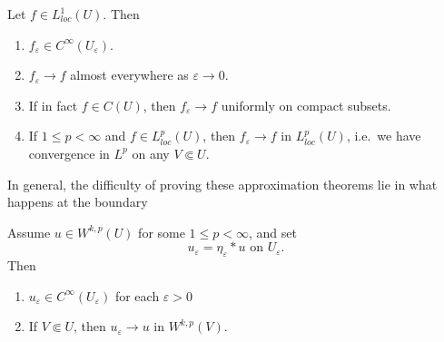 \documentclass[a4paper]{article}
\begin{document}
\begin{thm}
  Let $f \in L^1_{loc}(U)$. Then
  \begin{enumerate}
    \item $f_\varepsilon \in C^\infty(U_\varepsilon)$.
    \item $f_\varepsilon \to f$ almost everywhere as $\varepsilon \to 0$.
    \item If in fact $f \in C(U)$, then $f_\varepsilon \to f$ uniformly on compact subsets.
    \item If $1 \leq p < \infty$ and $f \in L^p_{loc}(U)$, then $f_\varepsilon \to f$ in $L^p_{loc}(U)$, i.e.\ we have convergence in $L^p$ on any $V \Subset U$.\fakeqed
  \end{enumerate}
\end{thm}
In general, the difficulty of proving these approximation theorems lie in what happens at the boundary
\begin{lemma}
  Assume $u \in W^{k, p}(U)$ for some $1 \leq p < \infty$, and set
  \[
    u_\varepsilon = \eta_\varepsilon * u\text{ on }U_\varepsilon.
  \]
  Then
  \begin{enumerate}
    \item $u_\varepsilon \in C^\infty(U_\varepsilon)$ for each $\varepsilon > 0$
    \item If $V \Subset U$, then $u_\varepsilon \to u$ in $W^{k, p}(V)$.
  \end{enumerate}
\end{lemma}
\end{document}
